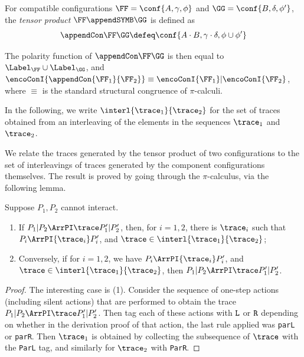 \begin{definition}
  \label{d:tensor_cogs}
For  compatible configurations
$ \FF = \conf{ A , \gamma, \phi }$
and 
$ \GG = \conf{ B , \delta, \phi' }$,  the \emph{tensor product} 
$\FF \appendSYMB \GG$ is  defined as 
\[ \appendCon \FF \GG  \defeq
 \conf{ A \cdot B , \gamma \cdot \delta, \phi \cup \phi' }
 \] 
 \end{definition}

\noindent
 The polarity function of $\appendCon \FF \GG$ 
 is then equal to $\Label_{\FF} \cup \Label_{\GG}$, and
$\encoConI {
\appendCon
{\FF_1} {\FF_2}}
\equiv 
\encoConI {
\FF_1}
|
\encoConI {
 {\FF_2}}$,  where $\equiv$ is the standard structural congruence of  $\pi$-calculi.
 

In the following, we write $\interl{\trace_1}{\trace_2}$ for the set of traces
obtained from an interleaving of the elements in the sequences $\trace_1$ and $\trace_2$.

We relate the traces generated by the tensor product 
of two configurations to the set of interleavings of traces generated 
by the component configurations themselves. 
The result is proved by going through the $\pi$-calculus,
via the following lemma.


\begin{lemma}
  \label{l:dec_pi}
  Suppose $P_1,P_2$ cannot interact.
  \begin{enumerate}
  \item
  If $P_1 | P_2 \ArrPI \trace   P_1'| P_2'$,
  then, for $i=1,2$,  there is  $ \trace_i $ 
  such that $P_i \ArrPI { \trace_i} P_i'$, and $ \trace  
  \in   \interl { \trace_1   }{ \trace_2 }$;
  \item 
  Conversely,
  if for  $i=1,2$,  we have $P_i \ArrPI { \trace_i} P_i'$, and $ \trace  
  \in   \interl { \trace_1   }{ \trace_2 }$, then 
  $P_1 | P_2 \ArrPI \trace   P_1'| P_2'$.
  \end{enumerate} 
\end{lemma} 


\begin{proof}
  The interesting case is (1). 
  Consider the sequence of one-step  actions (including silent actions) that 
  are performed to obtain the trace
  $P_1 | P_2 \ArrPI \trace   P_1'| P_2'$.  Then tag each of these actions with ${\tt L}$ or 
  ${\tt R}$ depending on whether in the derivation proof of that action, the last rule
  applied was {\tt parL} or  {\tt parR}.
  Then $ \trace_1$ is obtained by collecting the subsequence of $\trace$ with  
  the {\tt ParL} tag, and similarly for   $ \trace_2$ with
  {\tt ParR}.
\end{proof}


